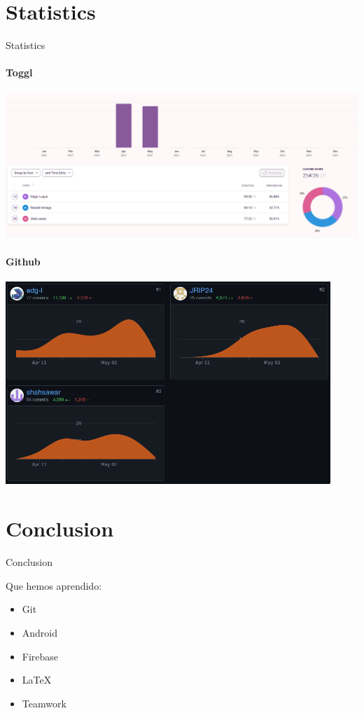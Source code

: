 \documentclass[12pt]{beamer}
\begin{document}
\section{Statistics}
\begin{frame}{Statistics}

 {
\framesubtitle{Toggl}
\includegraphics[width=\textwidth]{toggl-stats}
}

 {
\framesubtitle{Github}

\includegraphics[width=0.92\textwidth]{git-contributors}
}

\end{frame}


\section{Conclusion}
\begin{frame}{Conclusion}

Que hemos aprendido:

\begin{itemize}
\item Git
\item Android
\item Firebase
\item \LaTeX
\item Teamwork
\end{itemize}


\end{frame}
\end{document}
